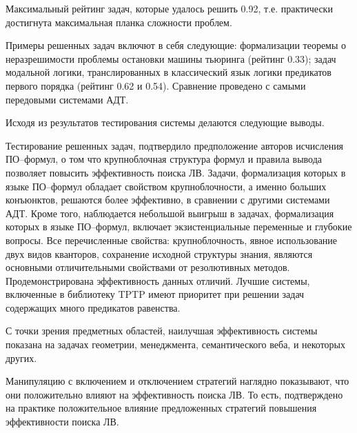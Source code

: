 \documentclass[a4paper]{report}
\begin{document}



Максимальный рейтинг задач, которые удалось решить 0.92, т.е. практически достигнута максимальная планка сложности проблем.

Примеры решенных задач включют в себя следующие: формализации теоремы о неразрешимости проблемы остановки машины тьюринга (рейтинг 0.33); задач модальной логики, транслированных в классический язык логики предикатов первого порядка (рейтинг 0.62 и 0.54). Сравнение проведено с самыми передовыми системами АДТ.

Исходя из результатов тестирования системы делаются следующие выводы.

Тестирование решенных задач, подтвердило предположение авторов исчисления ПО--формул, о том что крупноблочная структура формул и правила вывода позволяет повысить эффективность поиска ЛВ. Задачи, формализация которых в языке ПО--формул обладает свойством крупноблочности, а именно больших конъюнктов, решаются более эффективно, в сравнении с другими системами АДТ. Кроме того, наблюдается небольшой выигрыш в задачах, формализация которых в языке ПО--формул, включает экзистенциальные переменные и глубокие вопросы. Все перечисленные свойства: крупноблочность, явное использование двух видов кванторов, сохранение исходной структуры знания, являются основными отличительными свойствами от резолютивных методов. Продемонстрирована эффективность данных отличий. Лучшие системы, включенные в библиотеку TPTP имеют приоритет при решении задач содержащих много предикатов равенства.

С точки зрения предметных областей, наилучшая эффективность системы показана на задачах геометрии, менеджмента, семантического веба, и некоторых других.

Манипуляцию с включением и отключением стратегий наглядно показывают, что они положительно влияют на эффективность поиска ЛВ. То есть, подтверждено на практике положительное влияние предложенных стратегий повышения эффективности поиска ЛВ.
\end{document}
